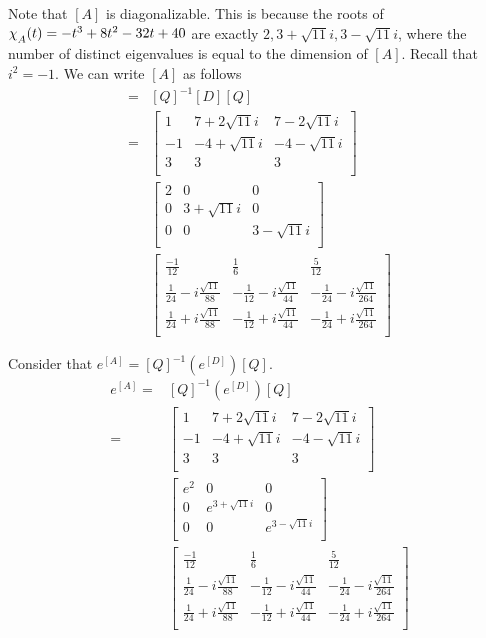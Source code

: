\documentclass[12pt, letterpaper]{article}
\begin{document}
Note that $[A]$ is diagonalizable. This is because the roots of $\chi_{\raisebox{-.5ex}{$\scriptstyle A$}}(t) = -t^3+8t^2-32t+40$ are exactly $2, 3+\sqrt{11}i, 3-\sqrt{11}i$, where the number of distinct eigenvalues is equal to the dimension of $[A]$. Recall that $i^2 = -1$. We can write $[A]$ as follows
\begin{align*}
[A] =& [Q]^{-1}[D][Q] \\
	=& \begin{bmatrix}
		1 & 7 + 2 \sqrt{11}i & 7 - 2 \sqrt{11}i \\
		-1 & -4 + \sqrt{11}i & -4 - \sqrt{11} i \\
		3 & 3 & 3 \\
		\end{bmatrix} \\
		&\begin{bmatrix}
		2 & 0 & 0 \\
		0 & 3 + \sqrt{11}i & 0 \\
		0 & 0 & 3 - \sqrt{11}i \\
		\end{bmatrix} \\
		&\begin{bmatrix}
		\frac{-1}{12} & \frac{1}{6} & \frac{5}{12} \\
		\frac{1}{24} - i \frac{\sqrt{11}}{88} & -\frac{1}{12} - i \frac{\sqrt{11}}{44} & -\frac{1}{24} - i \frac{\sqrt{11}}{264} \\
		\frac{1}{24} + i \frac{\sqrt{11}}{88} & -\frac{1}{12} + i \frac{\sqrt{11}}{44} & -\frac{1}{24} + i \frac{\sqrt{11}}{264} \\		
		\end{bmatrix}
\end{align*}

Consider that $e^{[A]} = [Q]^{-1}(e^{[D]})[Q]$.
\begin{align*}
e^{[A]} =& [Q]^{-1}(e^{[D]})[Q]\\
	=& \begin{bmatrix}
		1 & 7 + 2 \sqrt{11}i & 7 - 2 \sqrt{11}i \\
		-1 & -4 + \sqrt{11}i & -4 - \sqrt{11} i \\
		3 & 3 & 3 \\
		\end{bmatrix} \\
		&\begin{bmatrix}
		e^2 & 0 & 0 \\
		0 & e^{3 + \sqrt{11}i} & 0 \\
		0 & 0 & e^{3 - \sqrt{11}i} \\
		\end{bmatrix} \\
		&\begin{bmatrix}
		\frac{-1}{12} & \frac{1}{6} & \frac{5}{12} \\
		\frac{1}{24} - i \frac{\sqrt{11}}{88} & -\frac{1}{12} - i \frac{\sqrt{11}}{44} & -\frac{1}{24} - i \frac{\sqrt{11}}{264} \\
		\frac{1}{24} + i \frac{\sqrt{11}}{88} & -\frac{1}{12} + i \frac{\sqrt{11}}{44} & -\frac{1}{24} + i \frac{\sqrt{11}}{264} \\		
		\end{bmatrix}
\end{align*}
\end{document}
